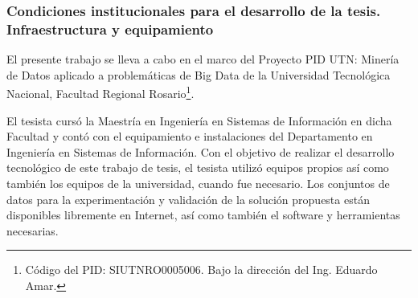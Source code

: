 \subsubsection{Condiciones institucionales para el desarrollo de la tesis. Infraestructura y equipamiento}
El presente trabajo se lleva a cabo en el marco del Proyecto PID UTN: Minería de Datos aplicado a problemáticas de Big Data de la Universidad Tecnológica Nacional, Facultad Regional Rosario\footnote{Código del PID: SIUTNRO0005006. Bajo la dirección del Ing. Eduardo Amar.}.

\bigskip El tesista cursó la Maestría en Ingeniería en Sistemas de Información en dicha Facultad y contó con el equipamiento e instalaciones del Departamento en Ingeniería en Sistemas de Información. Con el objetivo de realizar el desarrollo tecnológico de este trabajo de tesis, el tesista utilizó equipos propios así como también los equipos de la universidad, cuando fue necesario. Los conjuntos de datos para la experimentación y validación de la solución propuesta están disponibles libremente en Internet, así como también el software y herramientas necesarias.


















